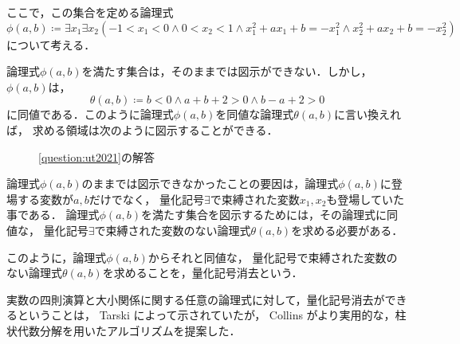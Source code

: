 \documentclass[uplatex, dvipdfmx]{jsarticle}
\numberwithin{equation}{section}
\theoremstyle{definition}
\begin{document}
     ここで，この集合を定める論理式
     \begin{equation}
          \phi(a,b) \coloneqq \exists x_1 \exists x_2(-1 < x_1 < 0 \land 0 < x_2 < 1 \land x_1^2+ax_1+b = -x_1^2 \land x_2^2 + ax_2 + b = -x_2^2)
     \end{equation}
     について考える．

     論理式$\phi(a,b)$を満たす集合は，そのままでは図示ができない．しかし，$\phi(a,b)$は，
     \begin{equation}
          \theta(a,b) \coloneqq b < 0 \land a+b+2>0 \land b-a+2>0
     \end{equation}
     に同値である．このように論理式$\phi(a,b)$を同値な論理式$\theta(a,b)$に言い換えれば，
     求める領域は次のように図示することができる．
     \begin{figure}[H]
          \centering
               \caption{\cref{question:ut2021}の解答}
          \label{fig:pic0}
     \end{figure}

     論理式$\phi(a,b)$のままでは図示できなかったことの要因は，論理式$\phi(a,b)$に登場する変数が$a,b$だけでなく，
     量化記号$\exists$で束縛された変数$x_1, x_2$も登場していた事である．
     論理式$\phi(a,b)$を満たす集合を図示するためには，その論理式に同値な，
     量化記号$\exists$で束縛された変数のない論理式$\theta(a,b)$を求める必要がある．

     このように，論理式$\phi(a,b)$からそれと同値な，
     量化記号で束縛された変数のない論理式$\theta(a,b)$を求めることを，量化記号消去という．

     実数の四則演算と大小関係に関する任意の論理式に対して，量化記号消去ができるということは，
     Tarski \cite{MR0044472}によって示されていたが，
     Collins \cite{MR0403962}がより実用的な，柱状代数分解を用いたアルゴリズムを提案した．
\end{document}
